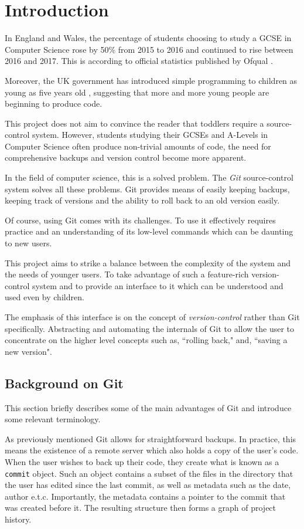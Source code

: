 \chapter{Introduction}

In England and Wales, the percentage of students choosing to study a GCSE in Computer Science rose by 50\% from 2015 to 2016 and continued to rise between 2016 and 2017. This is according to official statistics published by Ofqual  \cite{ofqual}.

Moreover, the UK government has introduced simple programming to children as young as five years old \cite{primarycoding}, suggesting that more and more young people are beginning to produce code.

This project does not aim to convince the reader that toddlers require a source-control system. However, students studying their GCSEs and A-Levels in Computer Science often produce non-trivial amounts of code, the need for comprehensive backups and version control become more apparent.

In the field of computer science, this is a solved problem. The \emph{Git} \cite{git} source-control system solves all these problems. Git provides means of easily keeping backups, keeping track of versions and the ability to roll back to an old version easily.

Of course, using Git comes with its challenges. To use it effectively requires practice and an understanding of its low-level commands which can be daunting to new users.

This project aims to strike a balance between the complexity of the system and the needs of younger users. To take advantage of such a feature-rich version-control system and to provide an interface to it which can be understood and used even by children.

The emphasis of this interface is on the concept of \emph{version-control} rather than Git specifically. Abstracting and automating the internals of Git to allow the user to concentrate on the higher level concepts such as, ``rolling back," and, ``saving a new version".

\section{Background on Git}

This section briefly describes some of the main advantages of Git and introduce some relevant terminology. 

As previously mentioned Git allows for straightforward backups. In practice, this means the existence of a remote server which also holds a copy of the user's code. When the user wishes to back up their code, they create what is known as a \texttt{commit} object. Such an object contains a subset of the files in the directory that the user has edited since the last commit, as well as metadata such as the date, author e.t.c. Importantly, the metadata contains a pointer to the commit that was created before it. The resulting structure then forms a graph of project history.

